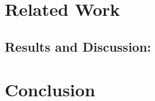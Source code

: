 \documentclass[conference]{IEEEtran}
\begin{document}
\section{Related Work}


\subsection{Results and Discussion:}\label{AA}


\section{Conclusion}




%
\end{document}
